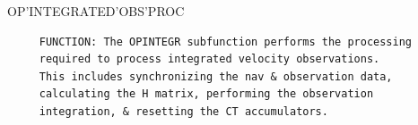 \begin{frame}
OP'INTEGRATED'OBS'PROC
\begin{verbatim}
     FUNCTION: The OPINTEGR subfunction performs the processing
     required to process integrated velocity observations.
     This includes synchronizing the nav & observation data,
     calculating the H matrix, performing the observation 
     integration, & resetting the CT accumulators.

\end{verbatim}
\end{frame}

